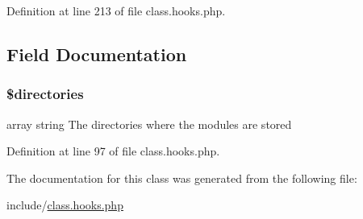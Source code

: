 Definition at line 213 of file class.\-hooks.\-php.




\subsection{Field Documentation}
\hypertarget{class_hook_aca1cfea95d9874525c94ddc586b87633}{
\subsubsection[{\$directories}]{\setlength{\rightskip}{0pt plus 5cm}\$directories\hspace{0.3cm}{\ttfamily [static]}}}\label{class_hook_aca1cfea95d9874525c94ddc586b87633}
array string The directories where the modules are stored 

Definition at line 97 of file class.\-hooks.\-php.



The documentation for this class was generated from the following file\-:\begin{DoxyCompactItemize}
\item 
include/\hyperlink{class_8hooks_8php}{class.\-hooks.\-php}\end{DoxyCompactItemize}
